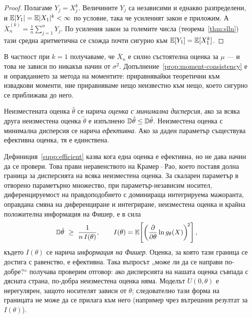 \begin{proof}
Полагаме $Y_j = X_j^k$. Величините $Y_j$ са независими и еднакво разпределени, и
$\mathbb{E}|Y_1| = \mathbb{E}|X_1|^k < \infty$ по условие, така че усиленият закон е приложим. А
$\overline{X}_n^{(k)} = \frac1n\sum_{j=1}^n Y_j$. По усиления закон за големите числа
(теорема~\ref{thm:slln}) тази средна аритметична се схожда почти сигурно към $\mathbb{E}[Y_1]
= \mathbb{E}[X_1^k]$.
\end{proof}

В частност при $k=1$ получаваме, че $\overline{X}_n$ е силно състоятелна оценка за $\mu$ —
и това не зависи по никакъв начин от $\sigma^2$. Допълнение~\ref{prop:moment-consistency} е
и оправданието за метода на моментите: приравнявайки теоретични към извадкови моменти, ние
приравняваме нещо неизвестно към нещо, което сигурно се приближава до него.

\begin{supp}\label{supp:efficient}
Неизместената оценка $\hat{\theta}$ се нарича \emph{оценка с минимална дисперсия},
ако за всяка друга неизместена оценка $\tilde{\theta}$ е изпълнено
$\mathbb{D} \hat{\theta} \le \mathbb{D} \tilde{\theta}$. Неизместена оценка с минимална
дисперсия се нарича \emph{ефективна}. Ако за даден параметър съществува ефективна
оценка, тя е единствена.
\end{supp}

\begin{supp}\label{supp:cramer-rao}
Дефиниция~\ref{supp:efficient} казва кога една оценка е ефективна, но не дава начин да се
провери. Това прави неравенството на Крамер\,--\,Рао, което поставя долна граница за
дисперсията на всяка неизместена оценка. За скаларен параметър в отворено
параметърно множество, при параметър-независим носител, диференцируемост на
правдоподобието с доминираща интегрируема мажоранта, оправдана смяна на
диференциране и интегриране, неизместена оценка и крайна положителна информация
на Фишер, е в сила
\[
\mathbb{D} \hat{\theta} \ \ge\ \frac{1}{n\, I(\theta)},
\qquad
I(\theta) = \mathbb{E}\!\left[ \left( \frac{\partial}{\partial \theta} \ln g_\theta(X) \right)^{\!2} \right],
\]
където $I(\theta)$ се нарича \emph{информация на Фишер}. Оценка, за която тази граница се
достига с равенство, е ефективна. Така въпросът „може ли да се направи по-добре?“ получава
проверим отговор: ако дисперсията на нашата оценка съвпада с дясната страна, по-добра
неизместена оценка няма. Моделът $U(0,\theta)$ е нерегулярен, защото носителят
зависи от $\theta$; следователно тази форма на границата не може да се прилага
към него (например чрез вътрешния резултат за $I(\theta)$).
\end{supp}

